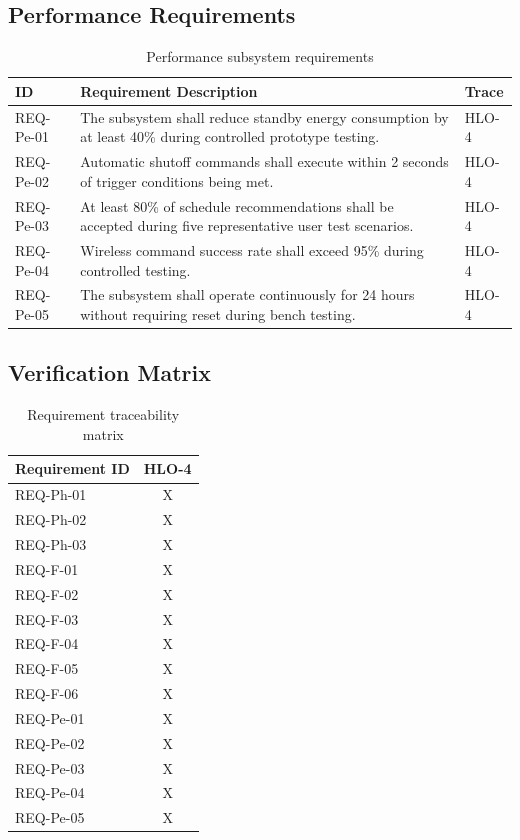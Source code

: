\documentclass[11pt, twoside, a4paper]{article}
\begin{document}
\subsection{Performance Requirements}

\begin{table}[H]
\caption{Performance subsystem requirements}
\centering
\renewcommand{\arraystretch}{1.2}
\begin{tabular}{|p{2.5cm}|p{10cm}|p{2cm}|}
\hline
\textbf{ID} & \textbf{Requirement Description} & \textbf{Trace} \\ \hline
REQ-Pe-01 & The subsystem shall reduce standby energy consumption by at least 40\% during controlled prototype testing. & HLO-4 \\ \hline
REQ-Pe-02 & Automatic shutoff commands shall execute within 2 seconds of trigger conditions being met. & HLO-4 \\ \hline
REQ-Pe-03 & At least 80\% of schedule recommendations shall be accepted during five representative user test scenarios. & HLO-4 \\ \hline
REQ-Pe-04 & Wireless command success rate shall exceed 95\% during controlled testing. & HLO-4 \\ \hline
REQ-Pe-05 & The subsystem shall operate continuously for 24 hours without requiring reset during bench testing. & HLO-4 \\ \hline
\end{tabular}
\end{table}

\subsection{Verification Matrix}

\begin{table}[H]
\caption{Requirement traceability matrix}
\centering
\renewcommand{\arraystretch}{1.15}
\begin{tabular}{|p{4cm}|c|}
\hline
\textbf{Requirement ID} & \textbf{HLO-4} \\ \hline
REQ-Ph-01 & X \\ \hline
REQ-Ph-02 & X \\ \hline
REQ-Ph-03 & X \\ \hline
REQ-F-01 & X \\ \hline
REQ-F-02 & X \\ \hline
REQ-F-03 & X \\ \hline
REQ-F-04 & X \\ \hline
REQ-F-05 & X \\ \hline
REQ-F-06 & X \\ \hline
REQ-Pe-01 & X \\ \hline
REQ-Pe-02 & X \\ \hline
REQ-Pe-03 & X \\ \hline
REQ-Pe-04 & X \\ \hline
REQ-Pe-05 & X \\ \hline
\end{tabular}
\end{table}
\end{document}
